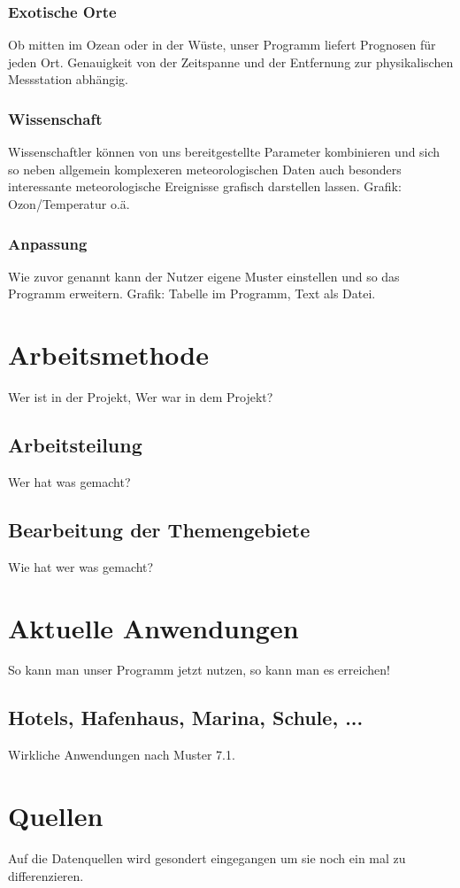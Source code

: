 \documentclass[a4paper,oneside,10pt,titlepage]{article}
\begin{document}
\subsubsection{Exotische Orte}
Ob mitten im Ozean oder in der Wüste, unser Programm liefert Prognosen für jeden Ort. Genauigkeit von der Zeitspanne und der Entfernung zur physikalischen Messstation abhängig.
\subsubsection{Wissenschaft}
Wissenschaftler können von uns bereitgestellte Parameter kombinieren und sich so neben allgemein komplexeren meteorologischen Daten auch besonders interessante meteorologische Ereignisse grafisch darstellen lassen.
Grafik: Ozon/Temperatur o.ä.
\subsubsection{Anpassung}
Wie zuvor genannt kann der Nutzer eigene Muster einstellen und so das Programm erweitern.
Grafik: Tabelle im Programm, Text als Datei.
\section{Arbeitsmethode}
Wer ist in der Projekt, Wer war in dem Projekt?
\subsection{Arbeitsteilung}
Wer hat was gemacht?
\subsection{Bearbeitung der Themengebiete}
Wie hat wer was gemacht?
\section{Aktuelle Anwendungen}
So kann man unser Programm jetzt nutzen, so kann man es erreichen!
\subsection{Hotels, Hafenhaus, Marina, Schule, ...}
Wirkliche Anwendungen nach Muster 7.1.
\section{Quellen}
Auf die Datenquellen wird gesondert eingegangen um sie noch ein mal zu differenzieren.
\end{document}
